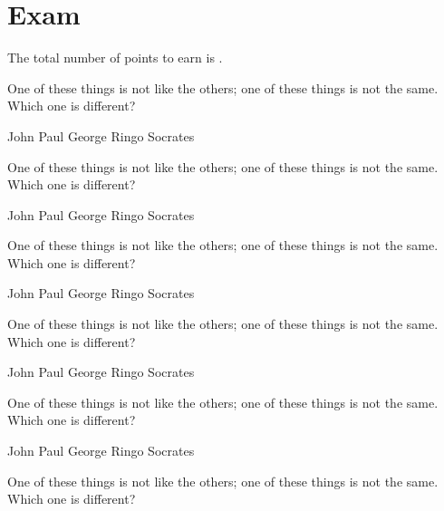 \documentclass[answers,addpoints]{exam}
\begin{document}
\section*{Exam}
The total number of points to earn is \numpoints.

\hrulefill


\begin{questions}




\question[5]
One of these things is not like the others; one of these
things is not the same. Which one is different?

\begin{randomizechoices}
\choice John
\choice Paul
\choice George
\choice Ringo
\CorrectChoice Socrates
\end{randomizechoices}

\question[5]
One of these things is not like the others; one of these
things is not the same. Which one is different?

\begin{randomizeoneparchoices}
\choice John
\choice Paul
\choice George
\choice Ringo
\CorrectChoice Socrates
\end{randomizeoneparchoices}

\question[5]
One of these things is not like the others; one of these
things is not the same. Which one is different?

\begin{randomizecheckboxes}
\choice John
\choice Paul
\choice George
\choice Ringo
\CorrectChoice Socrates
\end{randomizecheckboxes}

\question[5]
One of these things is not like the others; one of these
things is not the same. Which one is different?

\begin{randomizeoneparcheckboxes}
\choice John
\choice Paul
\choice George
\choice Ringo
\CorrectChoice Socrates
\end{randomizeoneparcheckboxes}

\question[5]
One of these things is not like the others; one of these
things is not the same. Which one is different?

\begin{randomizecheckboxes}
\choice John
\choice Paul
\choice George
\choice Ringo
\CorrectChoice Socrates
\end{randomizecheckboxes}

\question[5]
One of these things is not like the others; one of these
things is not the same. Which one is different?


\end{questions}
\end{document}
